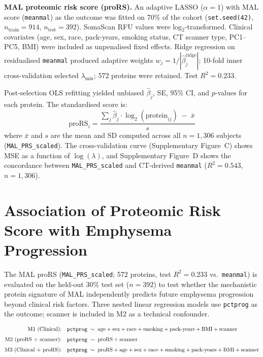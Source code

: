 \documentclass[11pt, letterpaper]{article}
\begin{document}
\textbf{MAL proteomic risk score (proRS).}
An adaptive LASSO ($\alpha = 1$) with MAL score (\texttt{meanmal}) as the
outcome was fitted on 70\% of the cohort
(\texttt{set.seed(42)}, $n_{\text{train}} = 914$,
$n_{\text{test}} = 392$). SomaScan RFU values were
log$_2$-transformed. Clinical covariates (age, sex, race, pack-years,
smoking status, CT scanner type, PC1--PC5, BMI) were included as
unpenalised fixed effects. Ridge regression on residualised \texttt{meanmal}
produced adaptive weights $w_j = 1/|\hat\beta^{\text{ridge}}_j|$;
10-fold inner cross-validation selected $\lambda_{\min}$; 572 proteins
were retained. Test $R^2 = 0.233$.

Post-selection OLS refitting yielded unbiased $\hat\beta_j$, SE, 95\% CI,
and $p$-values for each protein. The standardised score is:
\[
  \text{proRS}_i = \frac{\displaystyle\sum_{j} \hat\beta_j \cdot
    \log_2(\text{protein}_{ij}) \;-\; \bar{x}}
    {s}
\]
where $\bar{x}$ and $s$ are the mean and SD computed across all $n = 1{,}306$
subjects (\texttt{MAL\_PRS\_scaled}). The cross-validation curve
(Supplementary Figure~C) shows MSE as a function of $\log(\lambda)$,
and Supplementary Figure~D shows the concordance between
\texttt{MAL\_PRS\_scaled} and CT-derived \texttt{meanmal}
($R^2 = 0.543$, $n = 1{,}306$).

\section*{Association of Proteomic Risk Score with Emphysema Progression}

The MAL proRS (\texttt{MAL\_PRS\_scaled}; 572 proteins, test $R^2 = 0.233$
vs.\ \texttt{meanmal}) is evaluated on the held-out 30\% test set ($n = 392$)
to test whether the mechanistic protein signature of MAL independently
predicts future emphysema progression beyond clinical risk factors.
Three nested linear regression models use \texttt{pctprog} as the outcome;
scanner is included in M2 as a technical confounder.

\begin{align}
  \text{M1 (Clinical):} \quad
    &\texttt{pctprog} \;\sim\;
      \text{age} + \text{sex} + \text{race} + \text{smoking} +
      \text{pack-years} + \text{BMI} + \text{scanner} \notag \\[4pt]
  \text{M2 (proRS + scanner):} \quad
    &\texttt{pctprog} \;\sim\;
      \text{proRS} + \text{scanner} \notag \\[4pt]
  \text{M3 (Clinical + proRS):} \quad
    &\texttt{pctprog} \;\sim\;
      \text{proRS} + \text{age} + \text{sex} + \text{race} +
      \text{smoking} + \text{pack-years} + \text{BMI} + \text{scanner}
      \notag
\end{align}
\end{document}
